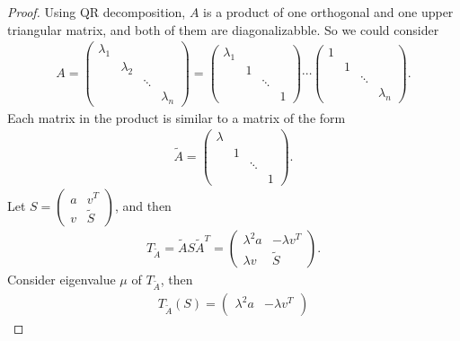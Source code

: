 \documentclass[11pt]{book}
\theoremstyle{definition}
\numberwithin{equation}{chapter}
\begin{document}
\begin{proof}
Using QR decomposition, $A$ is a product of one orthogonal and one upper triangular matrix, and both of them are diagonalizabble. So we could consider
\begin{align*}
    A = \begin{pmatrix}
        \lambda_1 & & & \\
        & \lambda_2 & & \\
        & & \ddots & \\
        & & & \lambda_n
    \end{pmatrix} = \begin{pmatrix}
        \lambda_1 & & & \\
        & 1 & & \\
        & & \ddots & \\
        & & & 1
    \end{pmatrix} \cdots \begin{pmatrix}
        1 & & & \\
        & 1 & & \\
        & & \ddots & \\
        & & & \lambda_n
    \end{pmatrix}.
\end{align*}
Each matrix in the product is similar to a matrix of the form
\begin{align*}
    \widetilde{A} = \begin{pmatrix}
        \lambda & & & \\
        & 1 & & \\
        & & \ddots & \\
        & & & 1
    \end{pmatrix}.
\end{align*}
Let $S = \begin{pmatrix}
    a & v^T \\
    v & \widetilde{S} 
\end{pmatrix}$, and then
\begin{align*}
    T_{\widetilde{A}} = \widetilde{A} S \widetilde{A}^T = \begin{pmatrix}
        \lambda^2 a & -\lambda v^T \\
        \lambda v & \widetilde{S} 
    \end{pmatrix}.
\end{align*}
Consider eigenvalue $\mu$ of $T_{\widetilde{A}}$, then
\begin{align*}
    T_{\widetilde{A}}(S) = \begin{pmatrix}
        \lambda^2 a & -\lambda v^T \\

\end{pmatrix}
\end{align*}
\end{proof}
\end{document}
